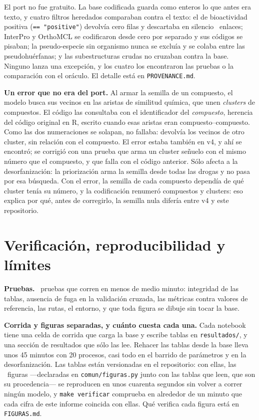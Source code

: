 \documentclass[11pt,a4paper]{article}
\begin{document}
El port no fue gratuito. La base codificada guarda como enteros lo que antes era
texto, y cuatro filtros heredados comparaban contra el texto: el de
bioactividad positiva (\texttt{== "positive"}) devolvía cero filas y descartaba
en silencio \NPositivos\ enlaces; InterPro y OrthoMCL se codificaron desde cero
por separado y sus códigos se pisaban; la pseudo-especie sin organismo nunca se
excluía y se colaba entre las pseudohuérfanas; y las subestructuras crudas
no cruzaban contra la base. Ninguno lanza una excepción, y los cuatro los
encontraron las pruebas o la comparación con el oráculo. El detalle está en
\texttt{PROVENANCE.md}.

\textbf{Un error que no era del port.} Al armar la semilla de un compuesto, el
modelo busca sus vecinos en las aristas de similitud química, que unen
\emph{clusters} de compuestos. El código las consultaba con el identificador del
\emph{compuesto}, herencia del código original en R, escrito cuando esas aristas
eran compuesto--compuesto. Como las dos numeraciones se solapan, no fallaba:
devolvía los vecinos de otro cluster, sin relación con el compuesto. El error
estaba también en v4, y ahí se encontró; se corrigió con una prueba que arma un
cluster señuelo con el mismo número que el compuesto, y que falla con el código
anterior. Sólo afecta a la desorfanización: la priorización arma la semilla
desde todas las drogas y no pasa por esa búsqueda. Con el error, la semilla de
cada compuesto dependía de qué cluster tenía su número, y la codificación
renumeró compuestos y clusters: eso explica por qué, antes de corregirlo, la
semilla nula difería entre v4 y este repositorio.

\section{Verificación, reproducibilidad y límites}

\textbf{Pruebas.} \NPruebas\ pruebas que corren en menos de medio minuto:
integridad de las tablas, ausencia de fuga en la validación cruzada, las
métricas contra valores de referencia, las rutas, el entorno, y que toda figura
se dibuje sin tocar la base.

\textbf{Corrida y figuras separadas, y cuánto cuesta cada una.} Cada notebook
tiene una celda de corrida que carga la base y escribe tablas en
\texttt{resultados/}, y una sección de resultados que sólo las lee. Rehacer las
tablas desde la base lleva unos 45 minutos con 20 procesos, casi todo en el
barrido de parámetros y en la desorfanización. Las tablas están versionadas en el
repositorio: con ellas, las \NFiguras\ figuras ---declaradas en
\texttt{comun/figuras.py} junto con las tablas que leen, que son su
procedencia--- se reproducen en unos cuarenta segundos sin volver a correr ningún
modelo, y \texttt{make verificar} comprueba en alrededor de un minuto que cada
cifra de este informe coincida con ellas. Qué verifica cada figura está en
\texttt{FIGURAS.md}.
\end{document}
